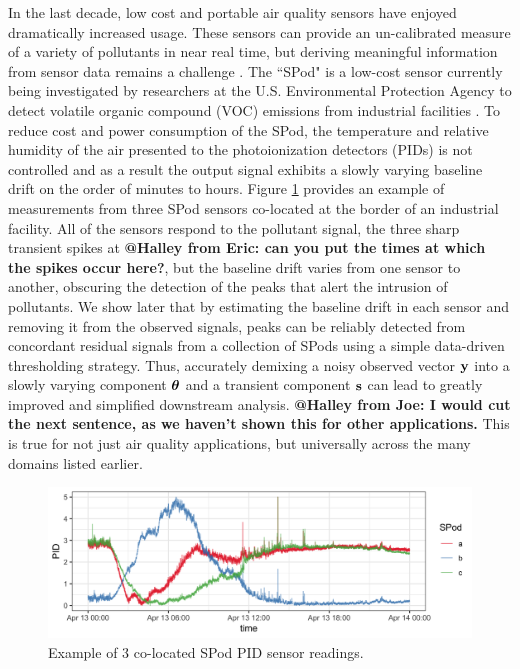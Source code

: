 \documentclass[12pt]{article}
\makeatletter
\newcommand{\Halley}[2]{{\bf {\color{purple}@Halley from #1: #2}}\xspace}
\newcommand{\V}[1]{{\bm{\mathbf{\MakeLowercase{#1}}}}} %
\makeatother
\begin{document}
In the last decade, low cost and portable air quality sensors have enjoyed dramatically increased usage. These sensors can provide an un-calibrated measure of a variety of pollutants in near real time, but deriving meaningful information from sensor data remains a challenge \citep{snyder2013changing}. The ``SPod" is a low-cost sensor currently being investigated by researchers at the U.S. Environmental Protection Agency to detect volatile organic compound (VOC) emissions from industrial facilities \citep{thoma2016south}. To reduce cost and power consumption of the SPod, the temperature and relative humidity of the air presented to the photoionization detectors (PIDs) is not controlled and as a result the output signal exhibits a slowly varying baseline drift on the order of minutes to hours. Figure \ref{fig:raw_spod} provides an example of measurements from three SPod sensors co-located at the border of an industrial facility. All of the sensors respond to the pollutant signal, the three sharp transient spikes at \Halley{Eric}{can you put the times at which the spikes occur here?}, but the baseline drift varies from one sensor to another, obscuring the detection of the peaks that alert the intrusion of pollutants. We show later that by estimating the baseline drift in each sensor %
 and  removing it from the observed signals, peaks can be reliably detected from concordant residual signals from a collection of SPods using a simple data-driven thresholding strategy. Thus, accurately demixing a noisy observed vector $\V{y}$ into a slowly varying component $\V{\theta}$ and a transient component $\V{s}$ can lead to greatly improved and simplified downstream analysis. \Halley{Joe}{I would cut the next sentence, as we haven't shown this for other applications.} This is true for not just air quality applications, but universally across the many domains listed earlier.

	\begin{figure}[t!]
		\includegraphics[width = \linewidth]{Figures/uncorrected_data.png}
		\caption{Example of 3 co-located SPod PID sensor readings.}
		\label{fig:raw_spod}
	\end{figure}
\end{document}
